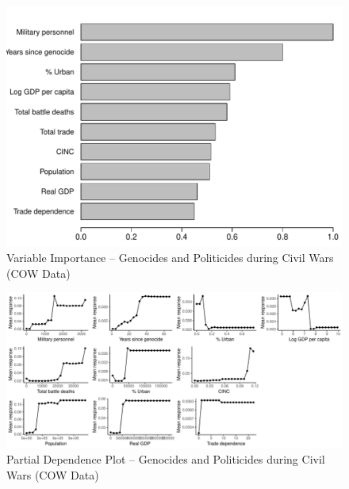 \begin{figure}
    \centering
    \includegraphics[width=\textwidth]{images/rf-uamk-cow.pdf}
    \caption{Variable Importance -- Genocides and Politicides during Civil Wars (COW Data)}
    \label{fig:rf-mk-ucdp}
\end{figure}

\newpage 

\clearpage
\begin{figure}
    \centering
    \includegraphics[width=\textwidth]{images/rf-uamk-cow-pd.pdf}
    \caption{Partial Dependence Plot -- Genocides and Politicides during Civil Wars (COW Data)}
    \label{fig:rf-mk-ucdp-pd}
\end{figure}
\clearpage

